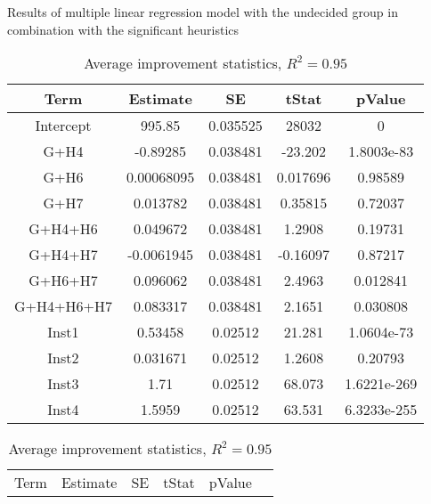 \documentclass[../main.tex]{subfiles}
\begin{document}
\begin{table}
    \centering
    \caption{Results of multiple linear regression model with the undecided group in combination with the significant heuristics}
    \begin{adjustbox}{width=\columnwidth,center}
        \begin{subtable}{.95\columnwidth}
            \centering
            \begin{tabular}{ccccc}
            \hline
            Term    &Estimate   & SE    & tStat & pValue \\ 
            \hline                
        Intercept       & 995.85    & 0.035525      & 28032     & 0         \\
            G+H4        & -0.89285  & 0.038481      & -23.202   & 1.8003e-83\\
            G+H6        & 0.00068095& 0.038481      & 0.017696  & 0.98589   \\
            G+H7        & 0.013782  & 0.038481      & 0.35815   & 0.72037   \\
            G+H4+H6     & 0.049672  & 0.038481      & 1.2908    & 0.19731   \\
            G+H4+H7     & -0.0061945& 0.038481      & -0.16097  & 0.87217   \\
            G+H6+H7     & 0.096062  & 0.038481      & 2.4963    & 0.012841  \\
            G+H4+H6+H7  & 0.083317  & 0.038481      & 2.1651    & 0.030808  \\
            Inst1       & 0.53458   & 0.02512       & 21.281    & 1.0604e-73\\
            Inst2       & 0.031671  & 0.02512       & 1.2608    & 0.20793   \\
            Inst3       & 1.71      & 0.02512       & 68.073    &1.6221e-269\\
            Inst4       & 1.5959    & 0.02512       & 63.531    &6.3233e-255\\
            \hline
            \end{tabular}
        \caption{Average improvement statistics, $R^2=0.95$}
        \label{tab:regrAvrgGroup}
        \end{subtable}
        \hfill
        \begin{subtable}{.75\columnwidth}
            \centering
            \begin{tabular}{cccccc}
            \hline
            Term    &Estimate   & SE    & tStat & pValue \\ 

\end{tabular}
\end{subtable}
\end{adjustbox}
\end{table}
\end{document}
